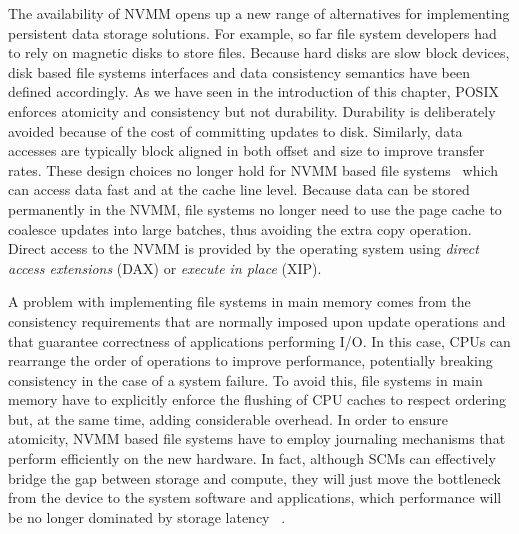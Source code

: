 The availability of NVMM opens up a new range of alternatives for implementing persistent data storage solutions. For example, so far file system developers had to rely on magnetic disks to store files. Because hard disks are 
slow block devices, disk based file systems interfaces and data consistency semantics have been defined accordingly. As we have seen in the introduction of this chapter, POSIX enforces atomicity and consistency but not durability. 
Durability is deliberately avoided because of the cost of committing updates to disk. Similarly, data accesses are typically block aligned in both offset and size to improve transfer rates. These design choices no longer hold 
for NVMM based file systems~\cite{Xu2016} which can access data fast and at the cache line level. Because data can be stored permanently in the NVMM, file systems no longer need to use the page cache to coalesce updates into large 
batches, thus avoiding the extra copy operation. Direct access to the NVMM is provided by the operating system using \textit{direct access extensions} (DAX) or \textit{execute in place} (XIP).

A problem with implementing file systems in main memory comes from the consistency requirements that are normally imposed upon update operations and that guarantee correctness of applications performing I/O. In this case, CPUs 
can rearrange the order of operations to improve performance, potentially breaking consistency in the case of a system failure. To avoid this, file systems in main memory have to explicitly enforce the flushing of CPU caches to 
respect ordering but, at the same time, adding considerable overhead. In order to ensure atomicity, NVMM based file systems have to employ journaling mechanisms that perform efficiently on the new hardware. In fact, although 
SCMs can effectively bridge the gap between storage and compute, they will just move the bottleneck from the device to the system software and applications, which performance will be no longer dominated by storage latency
~\cite{Katzburg2016}.

